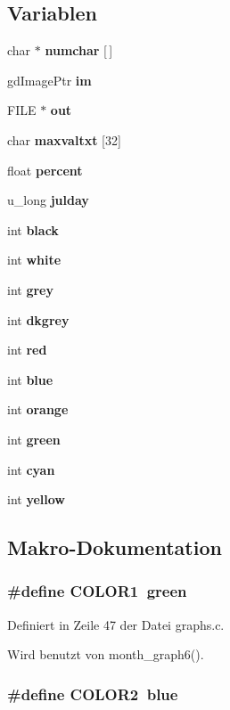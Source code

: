\subsection*{Variablen}
\begin{CompactItemize}
\item 
char $\ast$ {\bf numchar} [$\,$]
\item 
gd\-Image\-Ptr {\bf im}
\item 
FILE $\ast$ {\bf out}
\item 
char {\bf maxvaltxt} [32]
\item 
float {\bf percent}
\item 
u\_\-long {\bf julday}
\item 
int {\bf black}
\item 
int {\bf white}
\item 
int {\bf grey}
\item 
int {\bf dkgrey}
\item 
int {\bf red}
\item 
int {\bf blue}
\item 
int {\bf orange}
\item 
int {\bf green}
\item 
int {\bf cyan}
\item 
int {\bf yellow}
\end{CompactItemize}


\subsection{Makro-Dokumentation}
\subsubsection{\setlength{\rightskip}{0pt plus 5cm}\#define COLOR1~{\bf green}}\label{graphs_8c_1169cd1b397420b29bd3b0153f047818}




Definiert in Zeile 47 der Datei graphs.c.

Wird benutzt von month\_\-graph6().
\subsubsection{\setlength{\rightskip}{0pt plus 5cm}\#define COLOR2~{\bf blue}}\label{graphs_8c_609e0791889f4cde446ee0eb6efd369a}




